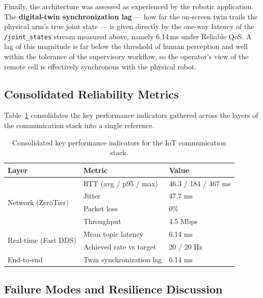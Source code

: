 Finally, the architecture was assessed as experienced by the robotic application. The \textbf{digital-twin synchronization lag} --- how far the on-screen twin trails the physical arm's true joint state --- is given directly by the one-way latency of the \texttt{/joint\_states} stream measured above, namely 6.14\,ms under Reliable QoS. A lag of this magnitude is far below the threshold of human perception and well within the tolerance of the supervisory workflow, so the operator's view of the remote cell is effectively synchronous with the physical robot.

\subsection{Consolidated Reliability Metrics}

Table~\ref{tab:iot_kpi} consolidates the key performance indicators gathered across the layers of the communication stack into a single reference.

\begin{table}[htbp]
    \centering
    \caption{Consolidated key performance indicators for the IoT communication stack.}
    \label{tab:iot_kpi}
    \begin{tabular}{lll}
        \toprule
        \textbf{Layer} & \textbf{Metric} & \textbf{Value} \\
        \midrule
        \multirow{4}{*}{Network (ZeroTier)}
            & RTT (avg / p95 / max)       & 46.3 / 184 / 467 ms \\
            & Jitter                      & 47.7 ms \\
            & Packet loss                 & 0\% \\
            & Throughput                  & 4.5 Mbps \\
        \midrule
        \multirow{2}{*}{Real-time (Fast DDS)}
            & Mean topic latency          & 6.14 ms \\
            & Achieved rate vs target     & 20 / 20 Hz \\
        \midrule
        End-to-end
            & Twin synchronization lag    & 6.14 ms \\
        \bottomrule
    \end{tabular}
\end{table}

\subsection{Failure Modes and Resilience Discussion}

